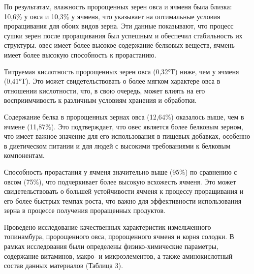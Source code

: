 
\begin{multicols}{2}
По результатам, влажность пророщенных зерен овса и ячменя была близка:
10,6\% у овса и 10,3\% у ячменя, что указывает на оптимальные условия
проращивания для обоих видов зерна. Эти данные показывают, что процесс
сушки зерен после проращивания был успешным и обеспечил стабильность их
структуры. овес имеет более высокое содержание белковых веществ, ячмень
имеет более высокую способность к прорастанию.

Титруемая кислотность пророщенных зерен овса (0,32°Т) ниже, чем у ячменя
(0,41°Т). Это может свидетельствовать о более мягком характере овса в
отношении кислотности, что, в свою очередь, может влиять на его
восприимчивость к различным условиям хранения и обработки.

Содержание белка в пророщенных зернах овса (12,64\%) оказалось выше, чем
в ячмене (11,87\%). Это подтверждает, что овес является более белковым
зерном, что имеет важное значение для его использования в пищевых
добавках, особенно в диетическом питании и для людей с высокими
требованиями к белковым компонентам.

Способность прорастания у ячменя значительно выше (95\%) по сравнению с
овсом (75\%), что подчеркивает более высокую всхожесть ячменя. Это может
свидетельствовать о большей устойчивости ячменя к процессу проращивания
и его более быстрых темпах роста, что важно для эффективности
использования зерна в процессе получения проращенных продуктов.

Проведено исследование качественных характеристик измельченного
топинамбура, пророщенного овса, пророщенного ячменя и корня солодки. В
рамках исследования были определены физико-химические параметры,
содержание витаминов, макро- и микроэлементов, а также аминокислотный
состав данных материалов (Таблица 3).
\end{multicols}

